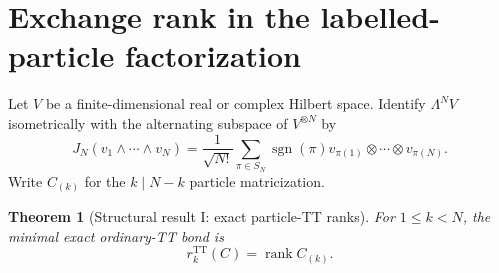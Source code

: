 \documentclass[aps,pra,reprint,superscriptaddress,nofootinbib,longbibliography,showkeys]{revtex4-2}
\newtheorem{theorem}{Theorem}[section]
\theoremstyle{definition}
\newcommand{\TT}{\mathrm{TT}}
\newcommand{\rank}{\operatorname{rank}}
\begin{document}
\section{Exchange rank in the labelled-particle factorization}

Let $V$ be a finite-dimensional real or complex Hilbert space.  Identify
$\Lambda^N V$ isometrically with the alternating subspace of $V^{\otimes N}$
by
\[
 J_N(v_1\wedge\cdots\wedge v_N)=\frac{1}{\sqrt{N!}}
 \sum_{\pi\in S_N}\operatorname{sgn}(\pi)
 v_{\pi(1)}\otimes\cdots\otimes v_{\pi(N)}.
\]
Write $C_{(k)}$ for the $k\mid N-k$ particle matricization.

\begin{theorem}[Structural result I: exact particle-TT ranks]
For $1\le k<N$, the minimal exact ordinary-TT bond is
\[
 r_k^{\TT}(C)=\rank C_{(k)}.
\]
\label{thm:r1}
\end{theorem}
\end{document}
